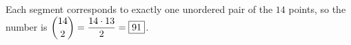 Each segment corresponds to exactly one unordered pair of the \(14\) points, so the number is \(\dbinom{14}{2}=\dfrac{14\cdot 13}{2}=\boxed{91}\).
